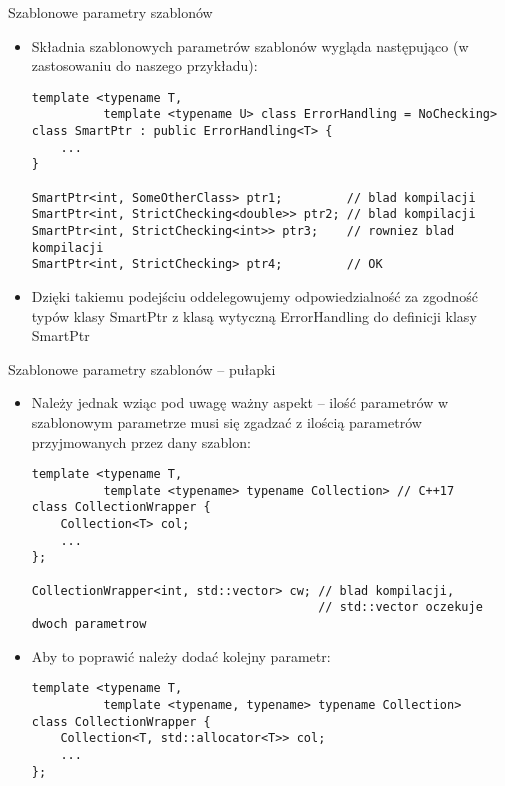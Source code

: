 \documentclass[11pt]{beamer}
\begin{document}
\begin{frame}[fragile]{Szablonowe parametry szablonów}
    \begin{itemize}
        \item Składnia szablonowych parametrów szablonów wygląda następująco (w zastosowaniu do naszego przykładu):
        \begin{lstlisting}[frame=single, basicstyle=\tiny]
template <typename T,
          template <typename U> class ErrorHandling = NoChecking>
class SmartPtr : public ErrorHandling<T> {
    ...
}

SmartPtr<int, SomeOtherClass> ptr1;         // blad kompilacji
SmartPtr<int, StrictChecking<double>> ptr2; // blad kompilacji
SmartPtr<int, StrictChecking<int>> ptr3;    // rowniez blad kompilacji
SmartPtr<int, StrictChecking> ptr4;         // OK
    \end{lstlisting}
        \item Dzięki takiemu podejściu oddelegowujemy odpowiedzialność za zgodność typów klasy SmartPtr z klasą wytyczną ErrorHandling do definicji klasy SmartPtr
    \end{itemize}
\end{frame}

\begin{frame}[fragile]{Szablonowe parametry szablonów -- pułapki}
    \begin{itemize}
        \item Należy jednak wziąc pod uwagę ważny aspekt -- ilość parametrów w szablonowym parametrze musi się zgadzać z ilością parametrów przyjmowanych przez dany szablon:
    \begin{lstlisting}[frame=single, basicstyle=\tiny]
template <typename T,
          template <typename> typename Collection> // C++17
class CollectionWrapper {
    Collection<T> col;
    ...
};

CollectionWrapper<int, std::vector> cw; // blad kompilacji,
                                        // std::vector oczekuje dwoch parametrow
    \end{lstlisting}
        \item Aby to poprawić należy dodać kolejny parametr:
    \begin{lstlisting}[frame=single, basicstyle=\tiny]
template <typename T,
          template <typename, typename> typename Collection>
class CollectionWrapper {
    Collection<T, std::allocator<T>> col;
    ...
};
    \end{lstlisting}   
    \end{itemize} 
\end{frame}
\end{document}
